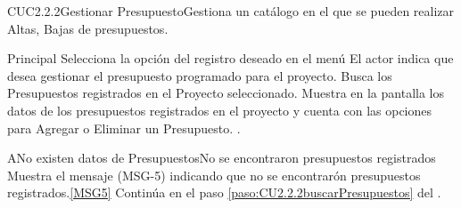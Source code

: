 %  
	\begin{UseCase}{CUC2.2.2}{Gestionar Presupuesto}{Gestiona un catálogo en el que se pueden realizar Altas, Bajas de presupuestos.}
	\end{UseCase}
		
	\begin{UCtrayectoria}{Principal}
		\UCpaso[\UCactor] Selecciona la opción  del registro deseado en el menú  
		\UCpaso[\UCactor] El actor indica que desea gestionar el presupuesto programado para el proyecto. 
		\UCpaso Busca los Presupuestos registrados en el Proyecto seleccionado. \label{paso:CU2.2.2buscarPresupuestos}
		\UCpaso Muestra en la pantalla  los datos de los presupuestos registrados en el proyecto y cuenta con las opciones para Agregar o Eliminar un Presupuesto.  .
	\end{UCtrayectoria}
	
	\begin{UCtrayectoriaA}{A}{No existen datos de Presupuestos}{No se encontraron presupuestos registrados}
			\UCpaso[\UCactor] Muestra el mensaje (MSG-5) indicando que no se encontrarón presupuestos registrados.\ref{MSG5}
			\UCpaso Continúa en el paso \ref{paso:CU2.2.2buscarPresupuestos} del .
	\end{UCtrayectoriaA}

